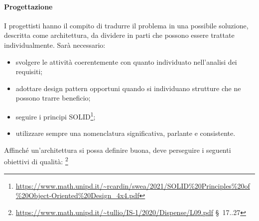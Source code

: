         \paragraph{Progettazione}
                I progettisti hanno il compito di tradurre il problema in una possibile soluzione, descritta come architettura, da dividere in parti che possono essere trattate individualmente. Sarà necessario:
                \begin{itemize}
                    \item svolgere le attività coerentemente con quanto individuato nell'analisi dei requisiti;
                    \item adottare design pattern opportuni quando si individuano strutture che ne possono trarre beneficio;
                    \item seguire i principi SOLID\footnote{\url{https://www.math.unipd.it/~rcardin/swea/2021/SOLID\%20Principles\%20of\%20Object-Oriented\%20Design_4x4.pdf}};
                    \item utilizzare sempre una nomenclatura significativa, parlante e consistente.
                \end{itemize}
                Affinché un'architettura si possa definire buona, deve perseguire i seguenti obiettivi di qualità: \footnote{\url{https://www.math.unipd.it/~tullio/IS-1/2020/Dispense/L09.pdf} \S\ 17..27}
